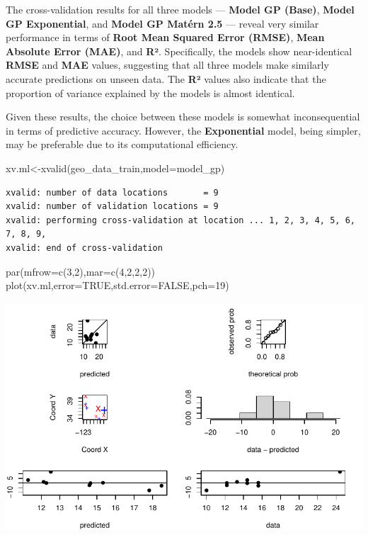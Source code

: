 \documentclass[
  11pt,
]{article}
\newenvironment{Shaded}{\begin{snugshade}}{\end{snugshade}}
\newcommand{\AttributeTok}[1]{\textcolor[rgb]{0.40,0.45,0.13}{#1}}
\newcommand{\ConstantTok}[1]{\textcolor[rgb]{0.56,0.35,0.01}{#1}}
\newcommand{\DecValTok}[1]{\textcolor[rgb]{0.68,0.00,0.00}{#1}}
\newcommand{\FunctionTok}[1]{\textcolor[rgb]{0.28,0.35,0.67}{#1}}
\newcommand{\NormalTok}[1]{\textcolor[rgb]{0.00,0.23,0.31}{#1}}
\newcommand{\OtherTok}[1]{\textcolor[rgb]{0.00,0.23,0.31}{#1}}
\begin{document}
The cross-validation results for all three models --- \textbf{Model GP
(Base)}, \textbf{Model GP Exponential}, and \textbf{Model GP Matérn 2.5}
--- reveal very similar performance in terms of \textbf{Root Mean
Squared Error (RMSE)}, \textbf{Mean Absolute Error (MAE)}, and
\textbf{R²}. Specifically, the models show near-identical \textbf{RMSE}
and \textbf{MAE} values, suggesting that all three models make similarly
accurate predictions on unseen data. The \textbf{R²} values also
indicate that the proportion of variance explained by the models is
almost identical.

Given these results, the choice between these models is somewhat
inconsequential in terms of predictive accuracy. However, the
\textbf{Exponential} model, being simpler, may be preferable due to its
computational efficiency.

\begin{Shaded}
\begin{Highlighting}[]
\NormalTok{xv.ml}\OtherTok{\textless{}{-}}\FunctionTok{xvalid}\NormalTok{(geo\_data\_train,}\AttributeTok{model=}\NormalTok{model\_gp)}
\end{Highlighting}
\end{Shaded}

\begin{verbatim}
xvalid: number of data locations       = 9
xvalid: number of validation locations = 9
xvalid: performing cross-validation at location ... 1, 2, 3, 4, 5, 6, 7, 8, 9, 
xvalid: end of cross-validation
\end{verbatim}

\begin{Shaded}
\begin{Highlighting}[]
 \FunctionTok{par}\NormalTok{(}\AttributeTok{mfrow=}\FunctionTok{c}\NormalTok{(}\DecValTok{3}\NormalTok{,}\DecValTok{2}\NormalTok{),}\AttributeTok{mar=}\FunctionTok{c}\NormalTok{(}\DecValTok{4}\NormalTok{,}\DecValTok{2}\NormalTok{,}\DecValTok{2}\NormalTok{,}\DecValTok{2}\NormalTok{))}
 \FunctionTok{plot}\NormalTok{(xv.ml,}\AttributeTok{error=}\ConstantTok{TRUE}\NormalTok{,}\AttributeTok{std.error=}\ConstantTok{FALSE}\NormalTok{,}\AttributeTok{pch=}\DecValTok{19}\NormalTok{)}
\end{Highlighting}
\end{Shaded}

\includegraphics{project_files/figure-pdf/unnamed-chunk-80-1.pdf}
\end{document}

